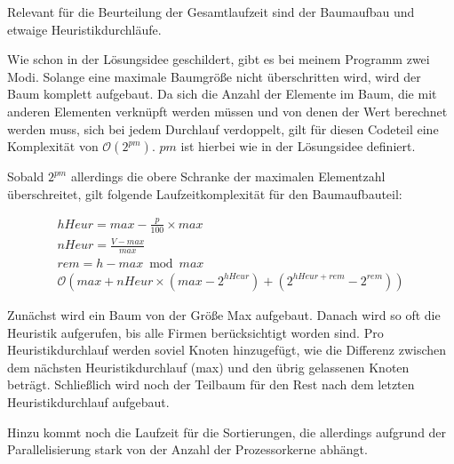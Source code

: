 Relevant für die Beurteilung der Gesamtlaufzeit sind der Baumaufbau und etwaige Heuristikdurchläufe.

Wie schon in der Lösungsidee geschildert, gibt es bei meinem Programm zwei Modi. Solange eine maximale Baumgröße nicht überschritten wird, wird der Baum komplett aufgebaut.
Da sich die Anzahl der Elemente im Baum, die mit anderen Elementen verknüpft werden müssen und von denen der Wert berechnet werden muss, sich bei jedem Durchlauf verdoppelt, gilt für diesen Codeteil eine Komplexität von \(\mathcal{O}(2^{pm})\). \(pm\) ist hierbei wie in der Lösungsidee definiert. 

Sobald \(2^{pm}\) allerdings die obere Schranke der maximalen Elementzahl überschreitet, gilt folgende Laufzeitkomplexität für den Baumaufbauteil:

\begin{gather}
	{hHeur} = max - \frac{p}{100} \times max \\
	{nHeur} = \frac{V-max}{max} \\
	{rem}   = h-max \bmod max \\
	\mathcal{O}(max+nHeur\times{}(max-2^{hHeur})+(2^{hHeur + rem}-2^{rem}))
\end{gather}

Zunächst wird ein Baum von der Größe Max aufgebaut. Danach wird so oft die Heuristik aufgerufen, bis alle Firmen berücksichtigt worden sind. Pro Heuristikdurchlauf werden soviel Knoten hinzugefügt, wie die Differenz zwischen dem nächsten Heuristikdurchlauf (max) und den übrig gelassenen Knoten beträgt. Schließlich wird noch der Teilbaum für den Rest nach dem letzten Heuristikdurchlauf aufgebaut.

Hinzu kommt noch die Laufzeit für die Sortierungen, die allerdings aufgrund der Parallelisierung stark von der Anzahl der Prozessorkerne abhängt.
